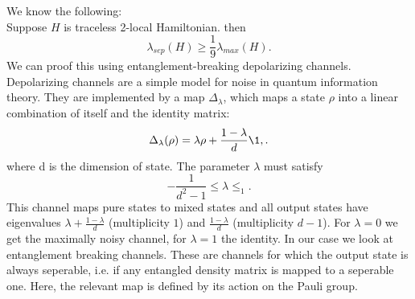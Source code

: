 We know the following: \\
Suppose $H$ is traceless 2-local Hamiltonian. then \[
	\lambda_{sep}(H)\ge \frac{1}{9}\lambda_{max}(H)
.\]
We can proof this using entanglement-breaking depolarizing channels.
Depolarizing channels are a simple model for noise in quantum information theory. \cite{nielsen11}
They are implemented by a map $\Delta_{\lambda}$, which maps a state  $\rho$ into a linear combination of itself and the identity matrix:\cite{king02}\[
	\Delta_{\lambda}(\rho)=\lambda\rho+\frac{1-\lambda}{d}\1,
.\]
where d is the dimension of state. The parameter $\lambda$ must satisfy \[
	-\frac{1}{d^2-1}\le\lambda\le_1
.\]
This channel maps pure states to mixed states and all output states have eigenvalues $\lambda+\frac{1-\lambda}{d}$ (multiplicity $1$) and $\frac{1-\lambda}{d}$ (multiplicity $d-1$).
For $\lambda=0$ we get the maximally noisy channel, for $\lambda=1$ the identity.
In our case we look at entanglement breaking channels.
These are channels for which the output state is always seperable, i.e. if any entangled density matrix is mapped to a seperable one.\cite{horodecki08}
Here, the relevant map is defined by its action on the Pauli group.
